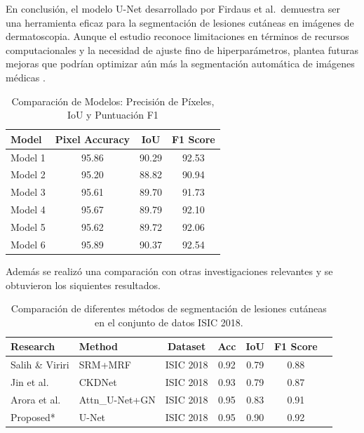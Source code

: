 En conclusión, el modelo U-Net desarrollado por Firdaus et al.\ demuestra ser una herramienta eficaz para la segmentación de lesiones cutáneas en imágenes de dermatoscopia. Aunque el estudio reconoce limitaciones en términos de recursos computacionales y la necesidad de ajuste fino de hiperparámetros, plantea futuras mejoras que podrían optimizar aún más la segmentación automática de imágenes médicas \cite{firdaus2023}.

\begin{table}[h!]
    \centering
    \begin{tabular}{lccc}
        \toprule
        \textbf{Model} & \textbf{Pixel Accuracy} & \textbf{IoU} & \textbf{F1 Score} \\
        \midrule
        Model 1 & 95.86 & 90.29 & 92.53 \\
        Model 2 & 95.20 & 88.82 & 90.94 \\
        Model 3 & 95.61 & 89.70 & 91.73 \\
        Model 4 & 95.67 & 89.79 & 92.10 \\
        Model 5 & 95.62 & 89.72 & 92.06 \\
        Model 6 & 95.89 & 90.37 & 92.54 \\
        \bottomrule
    \end{tabular}
    \caption{Comparación de Modelos: Precisión de Píxeles, IoU y Puntuación F1}
    \label{tab:comparison}
\end{table}

Además se realizó una comparación con otras investigaciones relevantes y se obtuvieron los siquientes resultados.

\begin{table}[h!]
    \centering
    \begin{tabular}{llccccc}
        \toprule
        \textbf{Research} & \textbf{Method} & \textbf{Dataset} & \textbf{Acc} & \textbf{IoU} & \textbf{F1 Score} \\
        \midrule
        Salih \& Viriri \cite{Salih2020} & SRM+MRF & ISIC 2018 & 0.92 & 0.79 & 0.88 \\
        Jin et al.\ \cite{Jin2021} & CKDNet & ISIC 2018 & 0.93 & 0.79 & 0.87 \\
        Arora et al.\ \cite{Arora2021} & Attn\_U-Net+GN & ISIC 2018 & 0.95 & 0.83 & 0.91 \\
        Proposed* & U-Net & ISIC 2018 & 0.95 & 0.90 & 0.92 \\
        \bottomrule
    \end{tabular}
    \caption{Comparación de diferentes métodos de segmentación de lesiones cutáneas en el conjunto de datos ISIC 2018.}
    \label{tab:comparison_methods}
\end{table}

